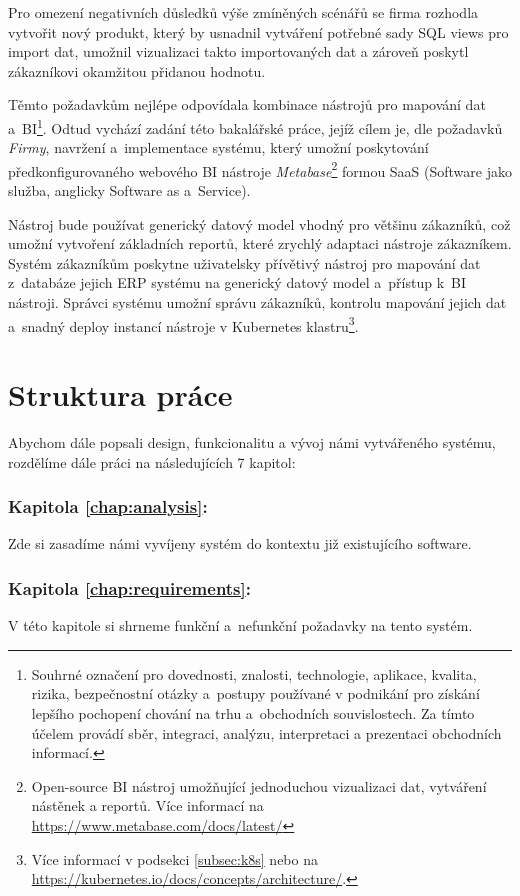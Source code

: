 Pro omezení negativních důsledků výše zmíněných scénářů se firma rozhodla vytvořit nový produkt, který by usnadnil  vytváření potřebné sady SQL views pro import dat, umožnil vizualizaci takto importovaných dat a zároveň poskytl zákazníkovi okamžitou přidanou hodnotu.

Těmto požadavkům nejlépe odpovídala kombinace nástrojů pro mapování dat a~BI\footnote{
Souhrné označení pro dovednosti, znalosti, technologie, aplikace, kvalita, rizika, bezpečnostní otázky a~postupy používané v podnikání pro získání lepšího pochopení chování na trhu a~obchodních souvislostech.
Za tímto účelem provádí sběr, integraci, analýzu, interpretaci a prezentaci obchodních informací.
}.
Odtud vychází zadání této bakalářské práce, jejíž cílem je, dle požadavků \textit{Firmy}, navržení a~implementace systému, který umožní poskytování předkonfigurovaného webového BI nástroje \textit{Metabase}\footnote{
Open-source BI nástroj umožňující jednoduchou vizualizaci dat, vytváření nástěnek a reportů. Více informací na \url{https://www.metabase.com/docs/latest/}
} 
formou SaaS (Software jako služba, anglicky Software as a~Service). 

Nástroj bude používat generický datový model vhodný pro většinu zákazníků, což umožní vytvoření základních reportů, které zrychlý adaptaci nástroje zákazníkem. Systém zákazníkům poskytne uživatelsky přívětivý nástroj pro mapování dat z~databáze jejich ERP systému na generický datový model a~přístup k~BI nástroji.
Správci systému umožní správu zákazníků, kontrolu mapování jejich dat a~snadný deploy instancí nástroje v Kubernetes klastru\footnote{Více informací v podsekci \ref{subsec:k8s} nebo na \url{https://kubernetes.io/docs/concepts/architecture/}.}. 

\section{Struktura práce}

Abychom dále popsali design, funkcionalitu a vývoj námi vytvářeného systému, rozdělíme dále práci na následujících 7 kapitol:

\subsubsection{Kapitola \ref{chap:analysis}: }
Zde si zasadíme námi vyvíjeny systém do kontextu již existujícího software.

\subsubsection{Kapitola \ref{chap:requirements}: }
V této kapitole si shrneme funkční a~nefunkční požadavky na tento systém.

